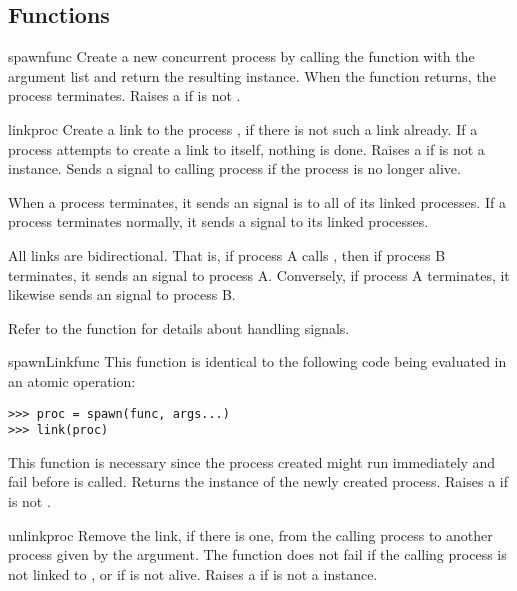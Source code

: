 \documentclass{howto}
\begin{document}
\subsection{Functions}

\begin{funcdesc}{spawn}{func}
Create a new concurrent process by calling the function  with the
 argument list and return the resulting  instance.
When the function returns, the process terminates. Raises a 
 if  is not .
\end{funcdesc}

\begin{funcdesc}{link}{proc}
Create a link to the process , if there is not such a link already. If
a process attempts to create a link to itself, nothing is done. Raises a
  if  is not a 
instance. Sends a   signal to calling process if the
 process is no longer alive.

When a process terminates, it sends an  signal is to all of its
linked processes. If a process terminates normally, it sends a 
 signal to its linked processes.

All links are bidirectional. That is, if process A calls , then if
process B terminates, it sends an  signal to process A. Conversely,
if process A terminates, it likewise sends an  signal to process B.

Refer to the  function for details about handling
signals.
\end{funcdesc}

\begin{funcdesc}{spawnLink}{func}
This function is identical to the following code being evaluated in an atomic
operation:
\begin{verbatim}
>>> proc = spawn(func, args...)
>>> link(proc)
\end{verbatim}
This function is necessary since the process created might run immediately and
fail before  is called. Returns the  instance of
the newly created process. Raises a   if
 is not .
\end{funcdesc}

\begin{funcdesc}{unlink}{proc}
Remove the link, if there is one, from the calling process to another process
given by the  argument. The function does not fail if the calling
process is not linked to , or if  is not alive. Raises a
  if  is not a 
instance.
\end{funcdesc}
\end{document}
